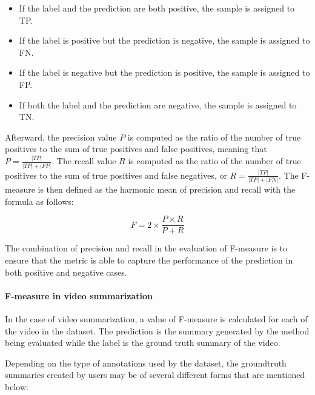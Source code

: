             \begin{itemize}
                \item If the label and the prediction are both positive, the sample is assigned to TP.
                \item If the label is positive but the prediction is negative, the sample is assigned to FN.
                \item If the label is negative but the prediction is positive, the sample is assigned to FP.
                \item If both the label and the prediction are negative, the sample is assigned to TN.
            \end{itemize}

            Afterward, the precision value $P$ is computed as the ratio of the number of true positives to the sum of true positives and false positives, meaning that $P = \frac{|TP|}{|TP| + |FP|}$. The recall value $R$ is computed as the ratio of the number of true positives to the sum of true positives and false negatives, or $R = \frac{|TP|}{|TP| + |FN|}$. The F-measure is then defined as the harmonic mean of precision and recall with the formula as follows:

            \begin{equation}
                \label{eq:f-measure}
                F = 2 \times \frac{P \times R}{P + R}
            \end{equation}

            The combination of precision and recall in the evaluation of F-measure is to ensure that the metric is able to capture the performance of the prediction in both positive and negative cases. 
        
        \paragraph[long]{F-measure in video summarization}
            In the case of video summarization, a value of F-measure is calculated for each of the video in the dataset. The prediction is the summary generated by the method being evaluated while the label is the ground truth summary of the video.
            
            Depending on the type of annotations used by the dataset, the groundtruth summaries created by users may be of several different forms that are mentioned below:

